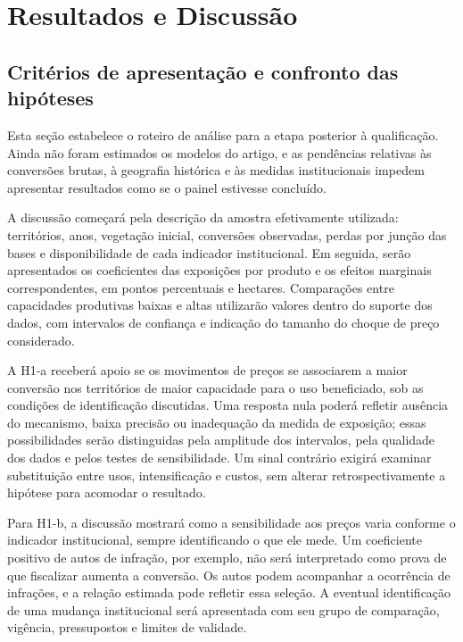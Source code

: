 \section{Resultados e Discussão}
\label{sec:discussao}

\subsection{Critérios de apresentação e confronto das hipóteses}

Esta seção estabelece o roteiro de análise para a etapa posterior à qualificação. Ainda não foram estimados os modelos do artigo, e as pendências relativas às conversões brutas, à geografia histórica e às medidas institucionais impedem apresentar resultados como se o painel estivesse concluído.

A discussão começará pela descrição da amostra efetivamente utilizada: territórios, anos, vegetação inicial, conversões observadas, perdas por junção das bases e disponibilidade de cada indicador institucional. Em seguida, serão apresentados os coeficientes das exposições por produto e os efeitos marginais correspondentes, em pontos percentuais e hectares. Comparações entre capacidades produtivas baixas e altas utilizarão valores dentro do suporte dos dados, com intervalos de confiança e indicação do tamanho do choque de preço considerado.

A H1-a receberá apoio se os movimentos de preços se associarem a maior conversão nos territórios de maior capacidade para o uso beneficiado, sob as condições de identificação discutidas. Uma resposta nula poderá refletir ausência do mecanismo, baixa precisão ou inadequação da medida de exposição; essas possibilidades serão distinguidas pela amplitude dos intervalos, pela qualidade dos dados e pelos testes de sensibilidade. Um sinal contrário exigirá examinar substituição entre usos, intensificação e custos, sem alterar retrospectivamente a hipótese para acomodar o resultado.

Para H1-b, a discussão mostrará como a sensibilidade aos preços varia conforme o indicador institucional, sempre identificando o que ele mede. Um coeficiente positivo de autos de infração, por exemplo, não será interpretado como prova de que fiscalizar aumenta a conversão. Os autos podem acompanhar a ocorrência de infrações, e a relação estimada pode refletir essa seleção. A eventual identificação de uma mudança institucional será apresentada com seu grupo de comparação, vigência, pressupostos e limites de validade.

